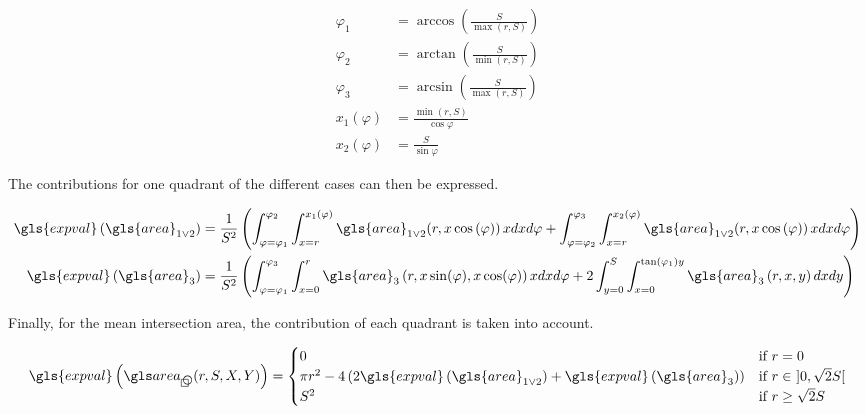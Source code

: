 \begin{appendix}
\begin{align}
  \varphi_1 &=
    \arccos \left( \frac{S}{\max(r, S)} \right) \\
  \varphi_2 &=
    \arctan \left( \frac{S}{\min(r, S)} \right) \\
  \varphi_3 &=
    \arcsin \left( \frac{S}{\max(r, S)} \right) \\
  x_1 (\varphi) &=
    \frac{\min(r, S)}{\cos{\varphi}} \\
  x_2 (\varphi) &=
    \frac{S}{\sin{\varphi}}
\end{align}

\medskip

The contributions for one quadrant of the different cases can then be expressed.

\begin{align}
  \gls{expval} \left( \gls{area}_{1 \lor 2} \right) &=
    \frac{1}{S^2} \left(
    \int_{\varphi = \varphi_1}^{\varphi_2}
    \int_{x=r}^{x_1(\varphi)}
    \gls{area}_{1 \lor 2} (r, x \cos \left( \varphi) \right)
    x dx d\varphi
    +
    \int_{\varphi = \varphi_2}^{\varphi_3}
    \int_{x=r}^{x_2(\varphi)}
    \gls{area}_{1 \lor 2} (r, x \cos \left( \varphi) \right)
    x dx d\varphi
    \right)
  \\
  \gls{expval} \left( \gls{area}_{3} \right) &=
    \frac{1}{S^2} \left(
    \int_{\varphi = \varphi_1}^{\varphi_3}
    \int_{x=0}^{r}
    \gls{area}_{3} \left( r, x \sin(\varphi), x \cos(\varphi) \right)
    x dx d\varphi
    +
    2 \int_{y = 0}^{S}
    \int_{x=0}^{\tan(\varphi_1)y}
    \gls{area}_{3} \left( r, x, y \right)
    dx dy
    \right)
\end{align}

\medskip

Finally, for the mean intersection area, the contribution of each quadrant is taken into account.

\begin{equation}\label{eq:mean-circle-square-intersection}
  \gls{expval} \left( \cirsqr (r, S, X, Y) \right) =
    \begin{cases}
      0 &\text{if } r = 0
      \\
      \pi r^2 - 4 \left(2 \gls{expval} \left( \gls{area}_{1 \lor 2} \right) +\gls{expval} \left( \gls{area}_{3} \right)\right) &\text{if } r \in \ ] 0, \sqrt{2} S [
      \\
      S^2 &\text{if } r \geq \sqrt{2} S
    \end{cases}
\end{equation}


\end{appendix}
